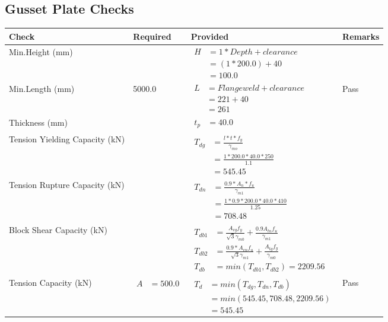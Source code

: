 \documentclass{article}%
\begin{document}
%
\newpage%
\subsection{Gusset Plate Checks}%
\label{subsec:GussetPlateChecks}%
\renewcommand{\arraystretch}{1.2}%
\begin{longtable}{|p{2.5cm}|p{5cm}|p{7.5cm}|p{1cm}|}%
\hline%
\rowcolor{OsdagGreen}%
Check&Required&Provided&Remarks\\%
\hline%
\endhead%
\hline%
Min.Height (mm)&&$\begin{aligned} H &= 1* Depth + clearance \\ &=(1*200.0)+40\\ &= 100.0\end{aligned}$&\\%
\hline%
Min.Length (mm)&5000.0&$\begin{aligned} L &= Flange weld + clearance \\ &= 221+40\\ &= 261\end{aligned}$&Pass\\%
\hline%
Thickness (mm)&&$\begin{aligned} t_p &=40.0\end{aligned}$&\\%
\hline%
Tension Yielding Capacity (kN)&&$\begin{aligned} T_{dg} &= \frac{l*t*f_y}{\gamma_{mo}}\\ &=\frac{1*200.0*40.0*250}{1.1}\\ &=545.45\end{aligned}$&\\%
\hline%
Tension Rupture Capacity (kN)&&$\begin{aligned} T_{dn} &= \frac{0.9*A_{n}*f_u}{\gamma_{m1}}\\ &=\frac{1*0.9*200.0*40.0*410}{1.25}\\ &=708.48\end{aligned}$&\\%
\hline%
Block Shear Capacity (kN)&&$\begin{aligned}T_{db1} &= \frac{A_{vg} f_{y}}{\sqrt{3} \gamma_{m0}} + \frac{0.9 A_{tn} f_{u}}{\gamma_{m1}}\\ T_{db2} &= \frac{0.9*A_{vn} f_{u}}{\sqrt{3} \gamma_{m1}} + \frac{A_{tg} f_{y}}{\gamma_{m0}}\\ T_{db} &= min(T_{db1}, T_{db2})= 2209.56\end{aligned}$&\\%
\hline%
Tension Capacity (kN)&$\begin{aligned} A &=500.0\end{aligned}$&$\begin{aligned} T_d &= min(T_{dg},T_{dn},T_{db})\\ &= min(545.45,708.48,2209.56)\\ &=545.45\end{aligned}$&Pass\\%
\hline%
\end{longtable}
\end{document}
